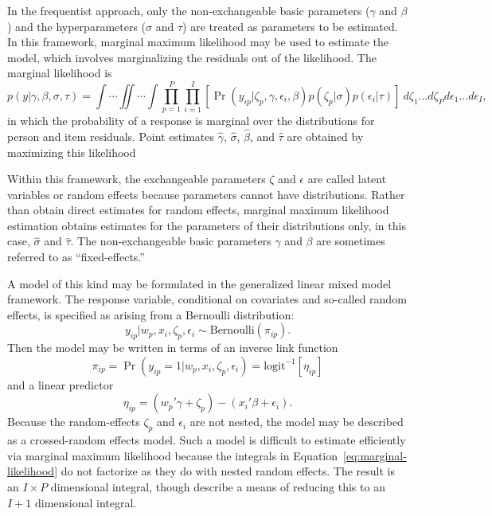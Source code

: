\documentclass[12pt, letterpaper]{article}
\begin{document}
In the frequentist approach, only the non-exchangeable basic parameters ($\gamma$ and  $\beta$) and the hyperparameters ($\sigma$ and $\tau$) are treated as parameters to be estimated. In this framework, marginal maximum likelihood may be used to estimate the model, which involves marginalizing the residuals out of the likelihood. The marginal likelihood is
\begin{equation} \label{eq:marginal-likelihood}
p(y | \gamma, \beta, \sigma, \tau) =
\int \cdots \iint \cdots \int
	\prod_{p=1}^P \prod_{i=1}^I
	\left [
		\Pr(y_{ip} | \zeta_p, \gamma, \epsilon_i, \beta)
		p(\zeta_p | \sigma)
		p(\epsilon_i | \tau)
	\right ]
~d \zeta_1 \ldots d \zeta_P d \epsilon_1 \ldots d \epsilon_I
,\end{equation}
in which the probability of a response is marginal over the distributions for person and item residuals. Point estimates $\hat\gamma$, $\hat\sigma$, $\hat\beta$, and $\hat\tau$ are obtained by maximizing this likelihood

Within this framework, the exchangeable parameters $\zeta$ and $\epsilon$ are called latent variables or random effects because parameters cannot have distributions. Rather than obtain direct estimates for random effects, marginal maximum likelihood estimation obtains estimates for the parameters of their distributions only, in this case, $\hat \sigma$ and $\hat\tau$. The non-exchangeable basic parameters $\gamma$ and $\beta$ are sometimes referred to as ``fixed-effects.''

A model of this kind may be formulated in the generalized linear mixed model framework. The response variable, conditional on covariates and so-called random effects, is specified as arising from a Bernoulli distribution:
\begin{equation}
	y_{ip} | w_p, x_i, \zeta_p, \epsilon_i \sim \mathrm{Bernoulli}(\pi_{ip})
.\end{equation}
Then the model may be written in terms of an inverse link function
\begin{equation}
	\pi_{ip} =
	\Pr(y_{ip} = 1 | w_p, x_i, \zeta_p, \epsilon_i) =
	\mathrm{logit}^{-1}[\eta_{ip}]
\end{equation}
and a linear predictor
\begin{equation}
	\eta_{ip} =
	(w_p'\gamma + \zeta_p) -
	(x_i'\beta + \epsilon_i)
.\end{equation}
Because the random-effects $\zeta_p$ and $\epsilon_i$ are not nested, the model may be described as a crossed-random effects model. Such a model is difficult to estimate efficiently via marginal maximum likelihood because the integrals in Equation~\ref{eq:marginal-likelihood} do not factorize as they do with nested random effects. The result is an $I \times P$ dimensional integral, though \textcite{rasbash1994efficient} describe a means of reducing this to an $I + 1$ dimensional integral.
\end{document}
